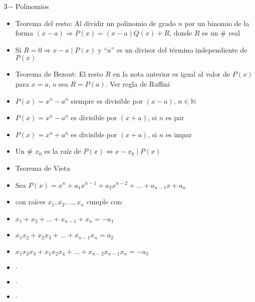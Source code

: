 \vspace{0.5cm}

$3\hspace{-0.05cm}\cdot\hspace{-0.05cm}\text{-}$ Polinomios
\begin{itemize}
    \def\labelitemi{-}
    \addtolength{\itemindent}{0.5cm}
    \item Teorema del resto: Al dividir un polinomio de grado $n$ por un binomio de la forma $(x-a) \Longrightarrow P(x) = (x-a)Q(x) + R$, donde $R$ es un \# real \vspace{-0.3cm}
    \item[] Si $R = 0 \Longrightarrow x-a \mid P(x)$ y ``$a$'' es un divisor del término independiente de $P(x)$
    \item Teorema de Bezout: El resto $R$ en la nota anterior es igual al valor de $P(x)$ para $x=a$, o sea $R = P(a)$. Ver regla de Ruffini
    \item $P(x)= x^n-a^n$ siempre es divisible por $(x-a)$, $n \in \mathbb{N}$
    \item $P(x)= x^n-a^n$ es divisible por $(x+a)$, si $n$ es par
    \item $P(x)= x^n+a^n$ es divisible por $(x+a)$, si $n$ es impar
    \item Un \# $x_0$ es la raíz de $P(x) \Longleftrightarrow x - x_0 \mid P(x)$
    \item Teorema de Vieta \vspace{-0.3cm}
    \item[] Sea $P(x) = x^n+a_1x^{n-1}+a_2x^{n-2}+ ... + a_{n-1}x + a_n$ \vspace{-0.3cm}
    \item[] con raíces $x_1, x_2,..., x_n$ cumple con: \vspace{-0.3cm}
    \item[] $x_1+x_2+...+x_{n-1}+x_n = -a_1$ \vspace{-0.3cm}
    \item[] $x_1x_2 + x_2x_3 + ... + x_{n-1}x_n = a_2$\vspace{-0.3cm}
    \item[] $x_1x_2x_3 + x_1x_2x_4 + ... + x_{n-2}x_{n-1}x_n = -a_3$\vspace{-0.3cm}
    \item[] $\cdot$ \vspace{-0.5cm}
    \item[] $\cdot$ \vspace{-0.5cm}
    \item[] $\cdot$ \vspace{-0.5cm}

\end{itemize}
